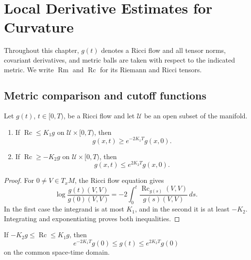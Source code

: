 \chapter{Local Derivative Estimates for Curvature}
\label{ch:chow-ii-local-derivative-estimates}

Throughout this chapter, \(g(t)\) denotes a Ricci flow and all tensor norms,
covariant derivatives, and metric balls are taken with respect to the indicated
metric.  We write \(\operatorname{Rm}\) and \(\operatorname{Rc}\) for its
Riemann and Ricci tensors.

\section{Metric comparison and cutoff functions}

\begin{lemma}
\label{lem:chow-ii-ricci-bounds-metric-comparison}
Let \(g(t)\), \(t\in[0,T)\), be a Ricci flow and let \(\mathcal U\) be an
open subset of the manifold.
\begin{enumerate}
\item If \(\operatorname{Rc}\le K_1g\) on \(\mathcal U\times[0,T)\), then
\[
g(x,t)\ge e^{-2K_1T}g(x,0).
\]
\item If \(\operatorname{Rc}\ge-K_2g\) on \(\mathcal U\times[0,T)\), then
\[
g(x,t)\le e^{2K_2T}g(x,0).
\]
\end{enumerate}
\end{lemma}
\begin{proof}
For \(0\ne V\in T_xM\), the Ricci flow equation gives
\[
\log\frac{g(t)(V,V)}{g(0)(V,V)}
=-2\int_0^t\frac{\operatorname{Rc}_{g(s)}(V,V)}{g(s)(V,V)}\,ds.
\]
In the first case the integrand is at most \(K_1\), and in the second it is
at least \(-K_2\).  Integrating and exponentiating proves both inequalities.
\end{proof}

\begin{remark}
\label{rem:chow-ii-uniform-metric-equivalence}
If \(-K_2g\le\operatorname{Rc}\le K_1g\), then
\[
e^{-2K_1T}g(0)\le g(t)\le e^{2K_2T}g(0)
\]
on the common space-time domain.
\end{remark}

